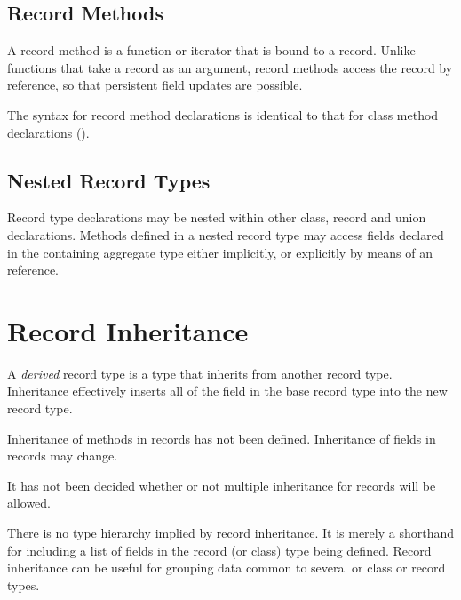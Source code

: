 \subsection{Record Methods}
\label{Record_Methods}

A record method is a function or iterator that is bound to a record.  Unlike
functions that take a record as an argument, record methods access the record by
reference, so that persistent field updates are possible.

The syntax for record method declarations is identical to that for class method
declarations ().

\subsection{Nested Record Types}
\label{Nested_Record_Types}

Record type declarations may be nested within other class, record and union
declarations.  Methods defined in a nested record type may access fields
declared in the containing aggregate type either implicitly, or explicitly by
means of an  reference.

\section{Record Inheritance}
\label{Record_Inheritance}

A \emph{derived} record type is a type that inherits from another record
type. Inheritance effectively inserts
all of the field in the base record type into the new record type.

\begin{openissue}
Inheritance of methods in records has not been defined. Inheritance of
fields in records may change.
\end{openissue}

\begin{openissue}
It has not been decided whether or not multiple inheritance for records
will be allowed.
\end{openissue}

There is no type hierarchy implied
by record inheritance.  It is merely a shorthand for including a list of fields
in the record (or class) type being defined.  Record inheritance can be useful
for grouping data common to several or class or record types.

